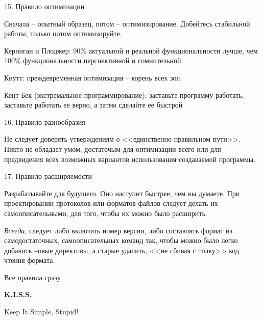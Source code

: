 \begin{frame}{15. Правило оптимизации}
	\begin{block}{Сначала -- опытный образец,  потом -- оптимизирование.}
		Добейтесь стабильной работы,  только потом оптимизируйте.
	\end{block}
	\pause
	\begin{block}{Керниган и Плоджер:}
		90\% актуальной и реальной функциональности лучше,  чем 100\% функциональности перспективной и сомнительной
	\end{block}
	\pause
	\begin{block}{Кнутт:}
		преждевременная оптимизация -- корень всех зол
	\end{block}
	\pause
	\begin{block}{Кент Бек (экстремальное программирование):}
		заставьте программу работать,  заставьте работать ее верно,  а затем сделайте ее быстрой
	\end{block}
\end{frame}

\begin{frame}{16. Правило разнообразия}
	\begin{block}{Не следует доверять утверждениям о <<единственно правильном пути>>.}
		\pause
		Никто не обладает умом,  достаточым для оптимизации всего или для предвидения всех возможных вариантов использования создаваемой программы.
	\end{block}
\end{frame}

\begin{frame}{17. Правило расширяемости}
	\begin{block}{Разрабатывайте для будущего. Оно наступит быстрее,  чем вы думаете.}
		\pause
		При проектировании протоколов или форматов файлов следует делать их самоописательными,  для того,  чтобы их можно было расширить.
	\end{block}
	\pause
	{\itshape Всегда},  следует либо включать номер версии,  либо составлять формат из самодостаточных,  
	самоописательных команд так,  чтобы можно было легко добавить новые директивы,  
	а старые удалить, <<не сбивая с толку>> код чтения формата.
\end{frame}

\begin{frame}{Все правила сразу}
	\begin{center}
	{\Huge\bfseries K.I.S.S.}

	\pause
	Keep It Simple,  Stupid!
	\end{center}
\end{frame}


